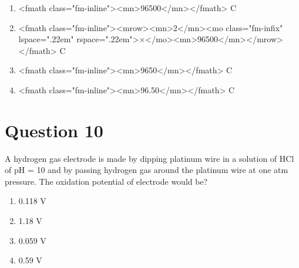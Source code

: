 \documentclass{article}
\begin{document}
\begin{enumerate}[label=(\alph*)]
\item <fmath class="fm-inline"><mn>96500</mn></fmath> C
\item <fmath class="fm-inline"><mrow><mn>2</mn><mo class="fm-infix" lspace=".22em" rspace=".22em">×</mo><mn>96500</mn></mrow></fmath> C
\item <fmath class="fm-inline"><mn>9650</mn></fmath> C
\item <fmath class="fm-inline"><mn>96.50</mn></fmath> C
\end{enumerate}
\newpage
\section*{Question 10}
A hydrogen gas electrode is made by dipping platinum wire in a solution of HCl of pH = 10 and by passing hydrogen gas around the platinum wire at one atm pressure. The oxidation potential of electrode would be? 
\begin{enumerate}[label=(\alph*)]
\item 0.118 V
\item 1.18 V
\item 0.059 V
\item 0.59 V
\end{enumerate}
\newpage
\end{document}
